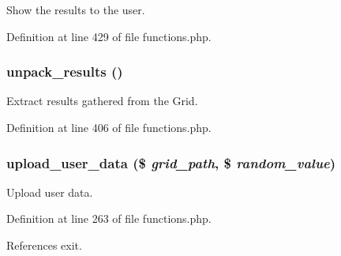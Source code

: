 Show the results to the user. 



Definition at line 429 of file functions.php.
\subsubsection{\setlength{\rightskip}{0pt plus 5cm}unpack\_\-results ()}\label{functions_8php_a10}


Extract results gathered from the Grid. 



Definition at line 406 of file functions.php.
\subsubsection{\setlength{\rightskip}{0pt plus 5cm}upload\_\-user\_\-data (\$ {\em grid\_\-path}, \$ {\em random\_\-value})}\label{functions_8php_a7}


Upload user data. 



Definition at line 263 of file functions.php.

References exit.